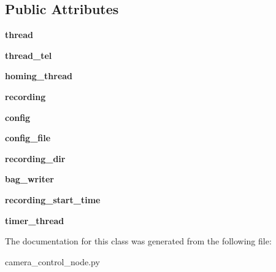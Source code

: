 \subsection*{Public Attributes}
\begin{DoxyCompactItemize}
\item 
\hypertarget{classcamera__control__node_1_1camera__qt__gui_aa51b652c0ce955aa1eab171ace12a34f}{{\bfseries thread}}\label{classcamera__control__node_1_1camera__qt__gui_aa51b652c0ce955aa1eab171ace12a34f}

\item 
\hypertarget{classcamera__control__node_1_1camera__qt__gui_a17ec8597b564c1546393647b90042168}{{\bfseries thread\-\_\-tel}}\label{classcamera__control__node_1_1camera__qt__gui_a17ec8597b564c1546393647b90042168}

\item 
\hypertarget{classcamera__control__node_1_1camera__qt__gui_ab38ef72cea850f55642e0df46d8245a6}{{\bfseries homing\-\_\-thread}}\label{classcamera__control__node_1_1camera__qt__gui_ab38ef72cea850f55642e0df46d8245a6}

\item 
\hypertarget{classcamera__control__node_1_1camera__qt__gui_acda3362c5fab51e71b724e46f47a869f}{{\bfseries recording}}\label{classcamera__control__node_1_1camera__qt__gui_acda3362c5fab51e71b724e46f47a869f}

\item 
\hypertarget{classcamera__control__node_1_1camera__qt__gui_a94aefe6248a7dd86623facecb9119a2c}{{\bfseries config}}\label{classcamera__control__node_1_1camera__qt__gui_a94aefe6248a7dd86623facecb9119a2c}

\item 
\hypertarget{classcamera__control__node_1_1camera__qt__gui_a314fae61303396fc529a517d6dcce73b}{{\bfseries config\-\_\-file}}\label{classcamera__control__node_1_1camera__qt__gui_a314fae61303396fc529a517d6dcce73b}

\item 
\hypertarget{classcamera__control__node_1_1camera__qt__gui_a17f826b0fd016987d92584d893625d21}{{\bfseries recording\-\_\-dir}}\label{classcamera__control__node_1_1camera__qt__gui_a17f826b0fd016987d92584d893625d21}

\item 
\hypertarget{classcamera__control__node_1_1camera__qt__gui_a5f8f10df5df3319f55c277b824fe29bb}{{\bfseries bag\-\_\-writer}}\label{classcamera__control__node_1_1camera__qt__gui_a5f8f10df5df3319f55c277b824fe29bb}

\item 
\hypertarget{classcamera__control__node_1_1camera__qt__gui_aa8778019630030aa94f283afbe73a036}{{\bfseries recording\-\_\-start\-\_\-time}}\label{classcamera__control__node_1_1camera__qt__gui_aa8778019630030aa94f283afbe73a036}

\item 
\hypertarget{classcamera__control__node_1_1camera__qt__gui_a0a96a70b0345324b47e4f75ec8d5c8a1}{{\bfseries timer\-\_\-thread}}\label{classcamera__control__node_1_1camera__qt__gui_a0a96a70b0345324b47e4f75ec8d5c8a1}

\end{DoxyCompactItemize}


The documentation for this class was generated from the following file\-:\begin{DoxyCompactItemize}
\item 
camera\-\_\-control\-\_\-node.\-py\end{DoxyCompactItemize}
